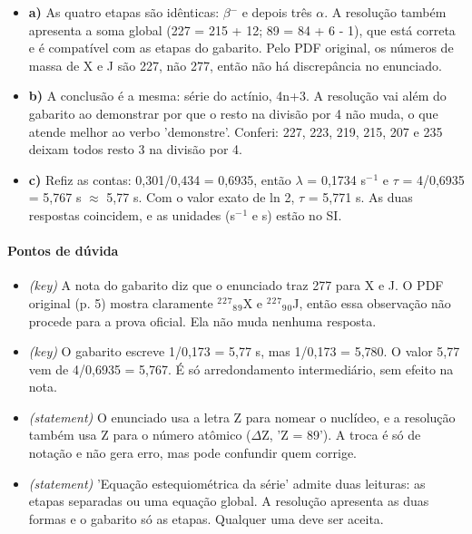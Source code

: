 \documentclass{article}%
\begin{document}
\begin{itemize}%
\item%
\textbf{a)} As quatro etapas são idênticas: $\beta$$^{-}$ e depois três $\alpha$. A resolução também apresenta a soma global (227 = 215 + 12; 89 = 84 + 6 - 1), que está correta e é compatível com as etapas do gabarito. Pelo PDF original, os números de massa de X e J são 227, não 277, então não há discrepância no enunciado.%
\item%
\textbf{b)} A conclusão é a mesma: série do actínio, 4n+3. A resolução vai além do gabarito ao demonstrar por que o resto na divisão por 4 não muda, o que atende melhor ao verbo 'demonstre'. Conferi: 227, 223, 219, 215, 207 e 235 deixam todos resto 3 na divisão por 4.%
\item%
\textbf{c)} Refiz as contas: 0,301/0,434 = 0,6935, então $\lambda$ = 0,1734 s$^{-}$$^{1}$ e $\tau$ = 4/0,6935 = 5,767 s $\approx$ 5,77 s. Com o valor exato de ln 2, $\tau$ = 5,771 s. As duas respostas coincidem, e as unidades (s$^{-}$$^{1}$ e s) estão no SI.%
\end{itemize}%
\paragraph{Pontos de dúvida}%
\begin{itemize}%
\item%
\textit{(key)} A nota do gabarito diz que o enunciado traz 277 para X e J. O PDF original (p. 5) mostra claramente $^2$$^2$$^{7}$$_{8}$$_{9}$X e $^2$$^2$$^{7}$$_{9}$$_{0}$J, então essa observação não procede para a prova oficial. Ela não muda nenhuma resposta.%
\item%
\textit{(key)} O gabarito escreve 1/0,173 = 5,77 s, mas 1/0,173 = 5,780. O valor 5,77 vem de 4/0,6935 = 5,767. É só arredondamento intermediário, sem efeito na nota.%
\item%
\textit{(statement)} O enunciado usa a letra Z para nomear o nuclídeo, e a resolução também usa Z para o número atômico ($\Delta$Z, 'Z = 89'). A troca é só de notação e não gera erro, mas pode confundir quem corrige.%
\item%
\textit{(statement)} 'Equação estequiométrica da série' admite duas leituras: as etapas separadas ou uma equação global. A resolução apresenta as duas formas e o gabarito só as etapas. Qualquer uma deve ser aceita.%
\end{itemize}%
\end{document}
